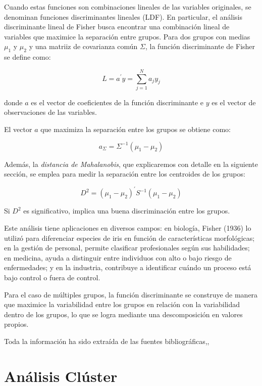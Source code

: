 Cuando estas funciones son combinaciones lineales de las variables originales, se denominan funciones discriminantes lineales (LDF). En
particular, el análisis discriminante lineal de Fisher busca encontrar una combinación lineal de variables que maximice la separación
entre grupos. Para dos grupos con medias $\mu_{1}$ y $\mu_{2}$ y una matriiz de covarianza común $\Sigma$, la función discriminante de Fisher
se define como:

\[
L = a^{'}y = \sum_{j=1}^{N} a_{j}y_{j}
\]

donde $a$ es el vector de coeficientes de la función discriminante e $y$ es el vector de observaciones de las variables. \newline

El vector $a$ que maximiza la separación entre los grupos se obtiene como:

\[
a_{\Sigma} = \Sigma^{-1}(\mu_{1}-\mu_{2})
\]

Además, la \textit{distancia de Mahalanobis}, que explicaremos con detalle en la siguiente sección, se emplea para medir la separación entre
los centroides de los grupos:

\[
D^{2} = (\mu_{1}-\mu_{2})^{'}S^{-1}(\mu_{1}-\mu_{2})
\]

Si $D^{2}$ es significativo, implica una buena discriminación entre los grupos. \newline

Este análisis tiene aplicaciones en diversos campos: en biología, Fisher (1936) lo utilizó para diferenciar especies de iris en función de
características morfológicas; en la gestión de personal, permite clasificar profesionales según sus habilidades; en medicina, ayuda a distinguir
entre individuos con alto o bajo riesgo de enfermedades; y en la industria, contribuye a identificar cuándo un proceso está bajo control o fuera 
de control. \newline

Para el caso de múltiples grupos, la función discriminante se construye de manera que maximice la variabilidad entre los grupos en relación con 
la variabilidad dentro de los grupos, lo que se logra mediante una descomposición en valores propios. \newline

Toda la información ha sido extraída de las fuentes bibliográficas\cite{bejar-PCA},\cite{bejar-AF}\cite{Bib-5},\cite{Bib-6} %

\section{Análisis Clúster}

